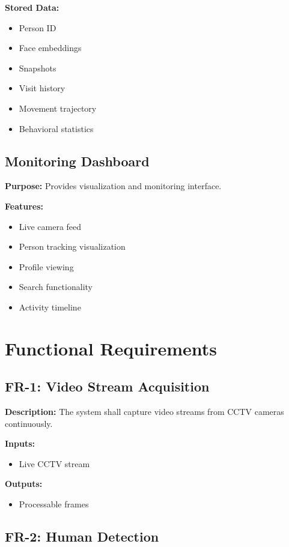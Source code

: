 \documentclass[12pt,a4paper]{article}
\begin{document}
\textbf{Stored Data:}
\begin{itemize}
    \item Person ID
    \item Face embeddings
    \item Snapshots
    \item Visit history
    \item Movement trajectory
    \item Behavioral statistics
\end{itemize}

\subsection{Monitoring Dashboard}

\textbf{Purpose:}
Provides visualization and monitoring interface.

\textbf{Features:}
\begin{itemize}
    \item Live camera feed
    \item Person tracking visualization
    \item Profile viewing
    \item Search functionality
    \item Activity timeline
\end{itemize}

\section{Functional Requirements}

\subsection{FR-1: Video Stream Acquisition}

\textbf{Description:}
The system shall capture video streams from CCTV cameras continuously.

\textbf{Inputs:}
\begin{itemize}
    \item Live CCTV stream
\end{itemize}

\textbf{Outputs:}
\begin{itemize}
    \item Processable frames
\end{itemize}

\subsection{FR-2: Human Detection}
\end{document}
